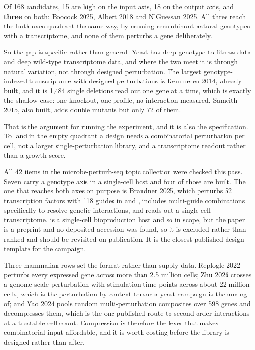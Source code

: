 Of 168 candidates, 15 are high on the input axis, 18 on the output axis, and \textbf{three}
on both: Boocock 2025, Albert 2018 and N'Guessan 2025. All three reach the both-axes
quadrant the same way, by crossing recombinant natural genotypes with a transcriptome, and
none of them perturbs a gene deliberately.

So the gap is specific rather than general. Yeast has deep genotype-to-fitness data and deep
wild-type transcriptome data, and where the two meet it is through natural variation, not
through designed perturbation. The largest genotype-indexed transcriptome with designed
perturbations is Kemmeren 2014, already built, and it is 1,484 single deletions read out one
gene at a time, which is exactly the shallow case: one knockout, one profile, no interaction
measured. Sameith 2015, also built, adds double mutants but only 72 of them.

That is the argument for running the experiment, and it is also the specification. To land
in the empty quadrant a design needs a combinatorial perturbation per cell, not a larger
single-perturbation library, and a transcriptome readout rather than a growth score.

 All 42 items in the
microbe-perturb-seq topic collection were checked this pass. Seven carry a genotype axis in
a single-cell host and four of those are built. The one that reaches both axes on purpose
is Brandner 2025, which perturbs 52 transcription factors with 118 guides in
 and , includes multi-guide combinations
specifically to resolve genetic interactions, and reads out a single-cell transcriptome.
 is a single-cell bioproduction host and so in scope, but the paper is a
preprint and no deposited accession was found, so it is excluded rather than ranked and
should be revisited on publication. It is the closest published design template for the
campaign.

Three mammalian rows set the format rather than supply data. Replogle 2022 perturbs every
expressed gene across more than 2.5 million cells; Zhu 2026 crosses a genome-scale
perturbation with stimulation time points across about 22 million cells, which is the
perturbation-by-context tensor a yeast campaign is the analog of; and Yao 2024 pools
random multi-perturbation composites over 598 genes and decompresses them, which is the one
published route to second-order interactions at a tractable cell count. Compression is
therefore the lever that makes combinatorial input affordable, and it is worth costing
before the library is designed rather than after.


